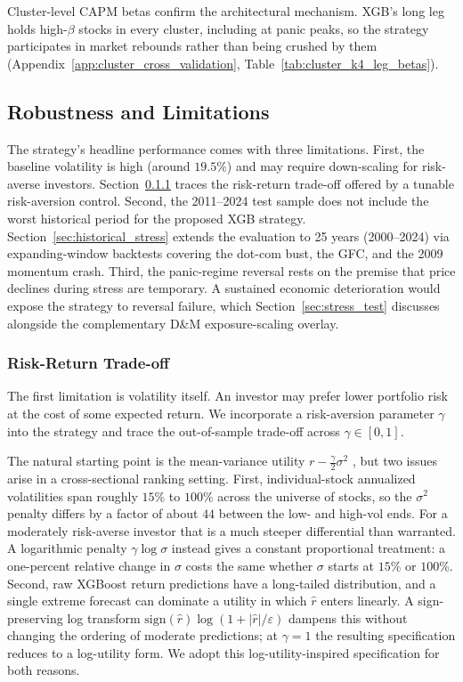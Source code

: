 Cluster-level CAPM betas confirm the architectural mechanism. XGB's long leg holds high-$\beta$ stocks in every cluster, including at panic peaks, so the strategy participates in market rebounds rather than being crushed by them (Appendix~\ref{app:cluster_cross_validation}, Table~\ref{tab:cluster_k4_leg_betas}).

\subsection{Robustness and Limitations}\label{sec:risk_aversion}

The strategy's headline performance comes with three limitations. First, the baseline volatility is high (around $19.5\%$) and may require down-scaling for risk-averse investors. Section~\ref{sec:risk_aversion_control} traces the risk-return trade-off offered by a tunable risk-aversion control. Second, the 2011--2024 test sample does not include the worst historical period for the proposed XGB strategy. Section~\ref{sec:historical_stress} extends the evaluation to 25 years (2000--2024) via expanding-window backtests covering the dot-com bust, the GFC, and the 2009 momentum crash. Third, the panic-regime reversal rests on the premise that price declines during stress are temporary. A sustained economic deterioration would expose the strategy to reversal failure, which Section~\ref{sec:stress_test} discusses alongside the complementary D\&M exposure-scaling overlay.
\subsubsection{Risk-Return Trade-off}\label{sec:risk_aversion_control}

The first limitation is volatility itself. An investor may prefer lower portfolio risk at the cost of some expected return. We incorporate a risk-aversion parameter $\gamma$ into the strategy and trace the out-of-sample trade-off across $\gamma \in [0, 1]$.

The natural starting point is the mean-variance utility $r - \frac{\gamma}{2}\sigma^2$ \citep{Markowitz1952}, but two issues arise in a cross-sectional ranking setting. First, individual-stock annualized volatilities span roughly $15\%$ to $100\%$ across the universe of stocks, so the $\sigma^2$ penalty differs by a factor of about $44$ between the low- and high-vol ends. For a moderately risk-averse investor that is a much steeper differential than warranted. A logarithmic penalty $\gamma\log\sigma$ instead gives a constant proportional treatment: a one-percent relative change in $\sigma$ costs the same whether $\sigma$ starts at $15\%$ or $100\%$. Second, raw XGBoost return predictions have a long-tailed distribution, and a single extreme forecast can dominate a utility in which $\hat{r}$ enters linearly. A sign-preserving log transform $\text{sign}(\hat r)\log(1 + |\hat r|/\varepsilon)$ dampens this without changing the ordering of moderate predictions; at $\gamma = 1$ the resulting specification reduces to a log-utility form. We adopt this log-utility-inspired specification for both reasons.

